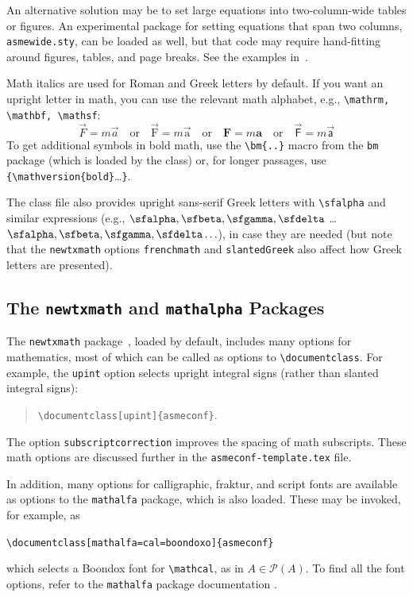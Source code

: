 \documentclass[balance,upint,subscriptcorrection,varvw,mathalfa=cal=boondoxo,spanish,french,vietnamese,russian,greek,pdf-a,fontspec,colorlinks]{asmeconf}
\begin{document}
An alternative solution may be to set large equations into two-column-wide tables or figures. An experimental package for setting equations that span two columns, \texttt{asmewide.sty}, can be loaded as well, but that code may require hand-fitting around figures, tables, and page breaks. See the examples in~\cite{lienhard2022}.

Math italics are used for Roman and Greek letters by default.  If you want an upright letter in math, you can use the relevant math alphabet, e.g., \verb|\mathrm, \mathbf, \mathsf|:
\begin{equation}\label{eqn:dw}
\vec{F} = m \vec{a} \quad\textrm{or}\quad \vec{\mathrm{F}} = m \vec{\mathrm{a}} \quad\textrm{or}\quad \mathbf{F} = m \mathbf{a} \quad\textrm{or}\quad \vec{\mathsf{F}} = m \vec{\mathsf{a}}
\end{equation}
To get additional symbols in bold math, use the \verb|\bm{..}| macro from the \texttt{bm} package (which is loaded by the class) or, for longer passages, use \verb|{\mathversion{bold}|\ldots\texttt{\}}.

The class file also provides upright sans-serif Greek letters with \verb|\sfalpha| and similar expressions (e.g., $\sfalpha, \sfbeta, \sfgamma, \sfdelta$ \ldots $\bm{\sfalpha, \sfbeta, \sfgamma, \sfdelta \ldots}$), in case they are needed (but note that the \verb|newtxmath| options \verb|frenchmath| and \verb|slantedGreek| also affect how Greek letters are presented).

\subsection{The \texttt{newtxmath} and \texttt{mathalpha} Packages~\cite{sharpe1,sharpe2}} The \texttt{newtxmath} package~\cite{sharpe1}, loaded by default, includes many options for mathematics, most of which can be called as options to \verb|\documentclass|. For example, the \texttt{upint} option selects upright integral signs (rather than slanted integral signs):
\begin{quote}
\verb|\documentclass[upint]{asmeconf}|. 
\end{quote}  
The option \verb|subscriptcorrection| improves the spacing of math subscripts. These math options are discussed further in the \texttt{asmeconf-template.tex} file. 

In addition, many options for calligraphic, fraktur, and script fonts are available as options to the \texttt{mathalfa} package, which is also loaded. These may be invoked, for example, as 
\begin{center}
\verb|\documentclass[mathalfa=cal=boondoxo]{asmeconf}| 
\end{center}
which selects a Boondox font for \verb|\mathcal|, as in $A \in \mathcal{P}(A)$. To find all the font options, refer to the \texttt{mathalfa} package documentation \cite{sharpe2}.
\end{document}
